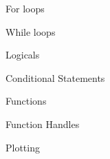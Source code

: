 \documentclass[8pt]{extarticle}
\begin{document}
    \newpage
    
    
    \vspace*{0.5cm}
    
    \begin{multicols}{2}
        \centering
        
        
        \begin{exampleBlock}{For loops}
        \end{exampleBlock}
        
        \begin{exampleBlock}{While loops}
        \end{exampleBlock}
        
        \begin{exampleBlock}{Logicals}
        \end{exampleBlock}
        
        \begin{exampleBlock}{Conditional Statements}
        \end{exampleBlock}
        
        \begin{exampleBlock}{Functions}
        \end{exampleBlock}
        
        \begin{exampleBlock}{Function Handles}
        \end{exampleBlock}
        
        \begin{exampleBlock}{Plotting}
            \quad\\
            

\end{exampleBlock}
\end{multicols}
\end{document}
